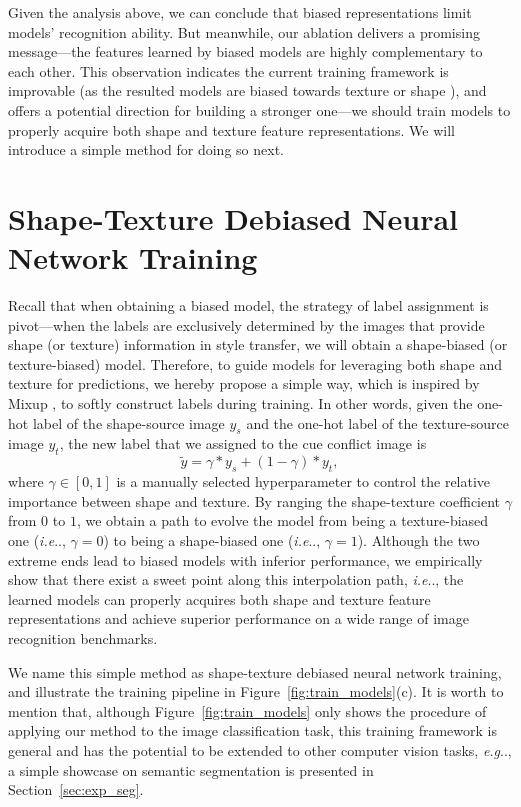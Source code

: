 \documentclass{article} \usepackage{iclr2021_conference,times}
\makeatletter
\DeclareRobustCommand\onedot{\futurelet\@let@token\@onedot}
\def\@onedot{\ifx\@let@token.\else.\null\fi\xspace}
\def\eg{\emph{e.g}\onedot} \def\Eg{\emph{E.g}\onedot}
\def\ie{\emph{i.e}\onedot} \def\Ie{\emph{I.e}\onedot}
\makeatother
\begin{document}
Given the analysis above, we can conclude that biased representations limit models' recognition ability. But meanwhile, our ablation delivers a promising message---the features learned by biased models are highly complementary to each other. This observation indicates the current training framework is improvable (as the resulted models are biased towards texture \citep{geirhos2018imagenettrained} or shape \citep{shi2020informative}), and offers a potential direction for building a stronger one---we should train models to properly acquire both shape and texture feature representations. We will introduce a simple method for doing so next.

\section{Shape-Texture Debiased Neural Network Training}
Recall that when obtaining a biased model, 
the strategy of label assignment is pivot---when the labels are exclusively determined by the images that provide shape (or texture) information in style transfer, we will obtain a shape-biased (or texture-biased) model.
Therefore, to guide models for leveraging both shape and texture for predictions, we hereby propose a simple way, which is inspired by Mixup \citep{zhang2018mixup}, to softly construct labels during training.
In other words, given the one-hot label of the shape-source image $y_s$ 
and the one-hot label of the texture-source image $y_t$, the new label that we assigned to the cue conflict image is
\begin{equation}\label{eq:label_mixup}
    \widetilde{y} = \gamma * y_s + (1 - \gamma) * y_t,
\end{equation}
where $\gamma \in [0, 1]$ is a manually selected hyperparameter to control the relative importance between shape and texture. 
By ranging the shape-texture coefficient $\gamma$ from $0$ to $1$,
we obtain a path to evolve the model from being a texture-biased one (\ie, $\gamma=0$) to being a shape-biased one (\ie, $\gamma=1$).
Although the two extreme ends lead to biased models with inferior performance, we empirically show that there exist a sweet point along this interpolation path, \ie, the learned models can properly acquires both shape and texture feature representations and achieve superior performance on a wide range of image recognition benchmarks.


We name this simple method as shape-texture debiased neural network training, and illustrate the training pipeline in   Figure~\ref{fig:train_models}(c). 
It is worth to mention that, although Figure~\ref{fig:train_models} only shows the procedure of applying our method to the image classification task, this training framework is general and has the potential to be extended to other computer vision tasks, \eg, a simple showcase on semantic segmentation is presented in Section~\ref{sec:exp_seg}.
\end{document}
